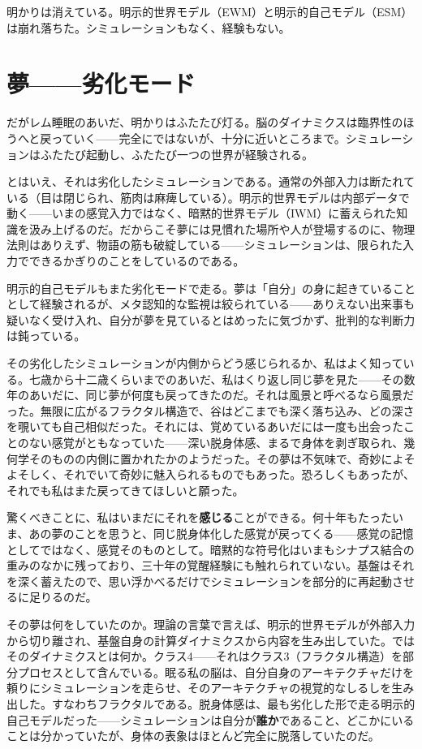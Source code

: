 \documentclass[11pt, twoside, openright]{book}
\begin{document}
明かりは消えている。明示的世界モデル（EWM）と明示的自己モデル（ESM）は崩れ落ちた。シミュレーションもなく、経験もない。

\section*{夢------劣化モード}

だがレム睡眠のあいだ、明かりはふたたび灯る。脳のダイナミクスは臨界性のほうへと戻っていく------完全にではないが、十分に近いところまで。シミュレーションはふたたび起動し、ふたたび一つの世界が経験される。

とはいえ、それは劣化したシミュレーションである。通常の外部入力は断たれている（目は閉じられ、筋肉は麻痺している）。明示的世界モデルは内部データで動く------いまの感覚入力ではなく、暗黙的世界モデル（IWM）に蓄えられた知識を汲み上げるのだ。だからこそ夢には見慣れた場所や人が登場するのに、物理法則はありえず、物語の筋も破綻している------シミュレーションは、限られた入力でできるかぎりのことをしているのである。

明示的自己モデルもまた劣化モードで走る。夢は「自分」の身に起きていることとして経験されるが、メタ認知的な監視は絞られている------ありえない出来事も疑いなく受け入れ、自分が夢を見ているとはめったに気づかず、批判的な判断力は鈍っている。

その劣化したシミュレーションが内側からどう感じられるか、私はよく知っている。七歳から十二歳くらいまでのあいだ、私はくり返し同じ夢を見た------その数年のあいだに、同じ夢が何度も戻ってきたのだ。それは風景と呼べるなら風景だった。無限に広がるフラクタル構造で、谷はどこまでも深く落ち込み、どの深さを覗いても自己相似だった。それには、覚めているあいだには一度も出会ったことのない感覚がともなっていた------深い脱身体感、まるで身体を剥ぎ取られ、幾何学そのものの内側に置かれたかのようだった。その夢は不気味で、奇妙によそよそしく、それでいて奇妙に魅入られるものでもあった。恐ろしくもあったが、それでも私はまた戻ってきてほしいと願った。

驚くべきことに、私はいまだにそれを\textbf{感じる}ことができる。何十年もたったいま、あの夢のことを思うと、同じ脱身体化した感覚が戻ってくる------感覚の記憶としてではなく、感覚そのものとして。暗黙的な符号化はいまもシナプス結合の重みのなかに残っており、三十年の覚醒経験にも触れられていない。基盤はそれを深く蓄えたので、思い浮かべるだけでシミュレーションを部分的に再起動させるに足りるのだ。

その夢は何をしていたのか。理論の言葉で言えば、明示的世界モデルが外部入力から切り離され、基盤自身の計算ダイナミクスから内容を生み出していた。ではそのダイナミクスとは何か。クラス4------それはクラス3（フラクタル構造）を部分プロセスとして含んでいる。眠る私の脳は、自分自身のアーキテクチャだけを頼りにシミュレーションを走らせ、そのアーキテクチャの視覚的なしるしを生み出した。すなわちフラクタルである。脱身体感は、最も劣化した形で走る明示的自己モデルだった------シミュレーションは自分が\textbf{誰か}であること、どこかにいることは分かっていたが、身体の表象はほとんど完全に脱落していたのだ。
\end{document}
